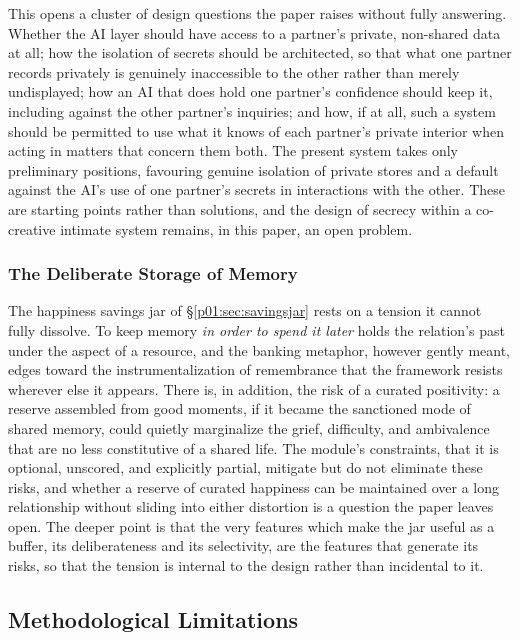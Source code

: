 \documentclass[11pt,a4paper]{article}
\begin{document}
This opens a cluster of design questions the paper raises without fully answering. Whether the AI layer should have access to a partner's private, non-shared data at all; how the isolation of secrets should be architected, so that what one partner records privately is genuinely inaccessible to the other rather than merely undisplayed; how an AI that does hold one partner's confidence should keep it, including against the other partner's inquiries; and how, if at all, such a system should be permitted to use what it knows of each partner's private interior when acting in matters that concern them both. The present system takes only preliminary positions, favouring genuine isolation of private stores and a default against the AI's use of one partner's secrets in interactions with the other. These are starting points rather than solutions, and the design of secrecy within a co-creative intimate system remains, in this paper, an open problem.

\subsubsection{The Deliberate Storage of Memory}

The happiness savings jar of §\ref{p01:sec:savingsjar} rests on a tension it cannot fully dissolve. To keep memory \emph{in order to spend it later} holds the relation's past under the aspect of a resource, and the banking metaphor, however gently meant, edges toward the instrumentalization of remembrance that the framework resists wherever else it appears. There is, in addition, the risk of a curated positivity: a reserve assembled from good moments, if it became the sanctioned mode of shared memory, could quietly marginalize the grief, difficulty, and ambivalence that are no less constitutive of a shared life. The module's constraints, that it is optional, unscored, and explicitly partial, mitigate but do not eliminate these risks, and whether a reserve of curated happiness can be maintained over a long relationship without sliding into either distortion is a question the paper leaves open. The deeper point is that the very features which make the jar useful as a buffer, its deliberateness and its selectivity, are the features that generate its risks, so that the tension is internal to the design rather than incidental to it.

\subsection{Methodological Limitations}
\end{document}

